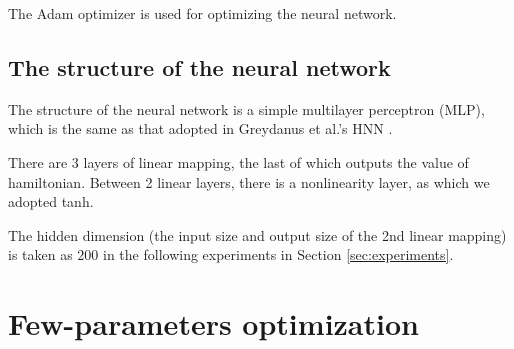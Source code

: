 \documentclass{article}
\begin{document}
The Adam optimizer \cite{kingma2017adam} is used for optimizing the neural network.

\subsection{The structure of the neural network}

The structure of the neural network is a simple multilayer perceptron (MLP),
which is the same as that adopted in Greydanus et al.'s HNN \cite{greydanus2019hamiltonian}.

There are 3 layers of linear mapping, the last of which outputs the value of hamiltonian.
Between 2 linear layers, there is a nonlinearity layer, as which we adopted tanh.

The hidden dimension (the input size and output size of the 2nd linear mapping)
is taken as $200$ in the following experiments in Section \ref{sec:experiments}.

\section{Few-parameters optimization}
\end{document}
